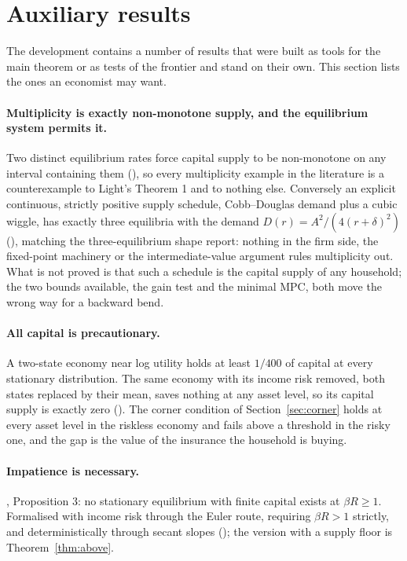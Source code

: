 \section{Auxiliary results}\label{sec:aux}

The development contains a number of results that were built as tools for the main theorem or as
tests of the frontier and stand on their own. This section lists the ones an economist may want.

\paragraph{Multiplicity is exactly non-monotone supply, and the equilibrium system permits it.}
Two distinct equilibrium rates force capital supply to be non-monotone on any interval containing
them (), so every multiplicity example in the literature
is a counterexample to Light's Theorem 1 and to nothing else. Conversely an explicit continuous,
strictly positive supply schedule, Cobb--Douglas demand plus a cubic wiggle, has exactly three
equilibria with the demand $D(r)=A^2/(4(r+\delta)^2)$ (),
matching the three-equilibrium shape \citet{YoungWalsh2025} report: nothing in the firm side, the
fixed-point machinery or the intermediate-value argument rules multiplicity out. What is not
proved is that such a schedule is the capital supply of any household; the two bounds available,
the gain test and the minimal MPC, both move the wrong way for a backward bend.

\paragraph{All capital is precautionary.}
A two-state economy near log utility holds at least $1/400$ of capital at every stationary
distribution. The same economy with its income risk removed, both states replaced by their mean,
saves nothing at any asset level, so its capital supply is exactly zero
(). The corner condition of Section~\ref{sec:corner}
holds at every asset level in the riskless economy and fails above a threshold in the risky one,
and the gap is the value of the insurance the household is buying.

\paragraph{Impatience is necessary.}
\citet{MarcetObiolsWeil2007}, Proposition 3: no stationary equilibrium with finite capital exists at
$\beta R\ge1$. Formalised with income risk through the Euler route, requiring $\beta R>1$ strictly,
and deterministically through secant slopes (); the version with a supply floor is
Theorem~\ref{thm:above}.

